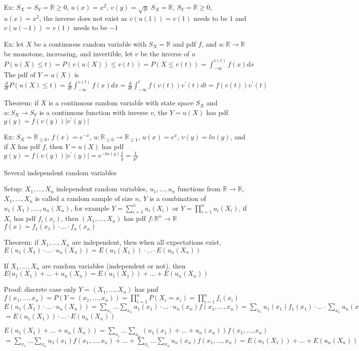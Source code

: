 \documentclass{article}
\begin{document}
Ex: $S_X=S_Y=\mathbb{R}\ge0$, $u(x)=x^2$, $v(y)=\sqrt{y}$
$S_X=\mathbb{R}$, $S_Y=\mathbb{R}\ge0$, $u(x)=x^2$, the inverse does not exist as $v(u(1))=v(1)$ needs to be $1$ and $v(u(-1))=v(1)$ needs to be $-1$

Ex: let $X$ be a continuous random variable with $S_X=\mathbb{R}$ and pdf $f$, and $u:\mathbb{R}\to\mathbb{R}$ be monotone, increasing, and invertible, let $v$ be the inverse of $u$
$P(u(X)\le t)=P(v(u(X))\le v(t))=P(X\le v(t))=\int_{-\infty}^{v(t)}f(x)dx$
The pdf of $Y=u(X)$ is $\frac{d}{dt}P(u(X)\le t)=\frac{d}{dt}\int_{-\infty}^{v(t)}f(x)dx=\frac{d}{dt}\int_{-\infty}^tf(v(t))v^\prime(t)dt=f(v(t))v^\prime(t)$

Theorem: if $X$ is a continuous random variable with state space $S_X$ and $u:S_X\to S_Y$ is a continuous function with inverse $v$, the $Y=u(X)$ has pdf $g(y)=f(v(y))\lvert v^\prime(y)\rvert$

Ex: $S_X=\mathbb{R}_{\ge0}$, $f(x)=e^{-x}$, $u:\mathbb{R}_{\ge0}\to\mathbb{R}_{\ge1}$, $u(x)=e^x$, $v(y)=ln(y)$, and if $X$ has pdf $f$, then $Y=u(X)$ has pdf $g(y)=f(v(y))\lvert v^\prime(y)\rvert=e^{-ln(y)}\frac{1}{y}=\frac{1}{y^2}$

Several independent random variables

Setup: $X_1,\dots,X_n$ independent random variables, $u_1,\dots,u_n$ functions from $\mathbb{R}\to\mathbb{R}$, $X_1,\dots,X_n$ is called a random sample of size $n$, $Y$ is a combination of $u_1(X_1),\dots,u_n(X_n)$, for example $Y=\sum_{i=1}^nu_i(X_i)$ or $Y=\prod_{i=1}^nu_i(X_i)$, if $X_i$ has pdf $f_i(x_i)$, then $(X_1,\dots,X_n)$ has pdf $f:\mathbb{R}^n\to\mathbb{R}$ $f(x)=f_1(x_1)\cdot\dots\cdot f_n(x_n)$

Theorem: if $X_1,\dots,X_n$ are independent, then when all expectations exist, $E(u_1(X_1)\cdot\dots\cdot u_n(X_n))=E(u_1(X_1))\cdot\dots\cdot E(u_n(X_n))$

If $X_1,\dots,X_n$ are random variables (independent or not), then $E(u_1(X_1)+\dots+u_n(X_n)=E(u_1(X_1))+\dots+E(u_n(X_n))$

Proof: discrete case only
$Y=(X_1,\dots,X_n)$ has pmf $f(x_1,\dots,x_n)=P(Y=(x_1,\dots,x_n))=\prod_{i=1}^nP(X_i=x_i)=\prod_{i=1}^nf_i(x_i)$
$E(u_1(X_1)\cdot\dots\cdot u_n(X_n))=\sum_{x_1}\dots\sum_{x_n}u_1(x_1)\cdot\dots\cdot u_n(x_n)f(x_1,\dots,x_n)=\sum_{x_1}u_1(x_1)f_1(x_1)\cdot\dots\cdot\sum_{x_n}u_n(x_n)f_n(x_n)$
$=E(u_1(X_1))\cdot\dots\cdot E(u_n(X_n))$

$E(u_1(X_1)+\dots+u_n(X_n))=\sum_{x_1}\dots\sum_{x_n}(u_1(x_1)+\dots+u_n(x_n))f(x_1,\dots,x_n)$
$=\sum_{x_1}\dots\sum_{x_n}u_1(x_1)f(x_1,\dots,x_n)+\dots+\sum_{x_1}\dots\sum_{x_n}u_n(x_n)f(x_1,\dots,x_n)=E(u_1(X_1))+\dots+E(u_n(X_n))$
\end{document}
